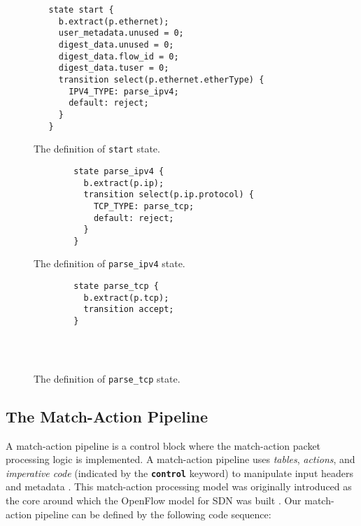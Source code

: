 \begin{figure}[!h]
	{\renewcommand{\baselinestretch}{0.8}\small
		\begin{verbatim}
   state start {
     b.extract(p.ethernet);
     user_metadata.unused = 0;
     digest_data.unused = 0;
     digest_data.flow_id = 0;
     digest_data.tuser = 0;
     transition select(p.ethernet.etherType) {
       IPV4_TYPE: parse_ipv4;
       default: reject;
     } 
   }
		\end{verbatim}
	}
\caption{The definition of \texttt{start} state.}
\label{fig:start}
\end{figure}

\begin{figure}[!h]
	\begin{minipage}{.48\textwidth}
		{\renewcommand{\baselinestretch}{0.8}\small
		\begin{verbatim}
		state parse_ipv4 {
		  b.extract(p.ip);
		  transition select(p.ip.protocol) {
		    TCP_TYPE: parse_tcp;
		    default: reject;
		  }
		}
		\end{verbatim}
		}
 		\caption{The definition of \texttt{parse\_ipv4} state.}
 		\label{fig:parseipv4}
	\end{minipage}
	\hfill
	\begin{minipage}{.48\textwidth}
		{\renewcommand{\baselinestretch}{0.8}\small
		\begin{verbatim}
		state parse_tcp {
		  b.extract(p.tcp);
		  transition accept;
		}
		    
		    
		    
		\end{verbatim}
		}	
		\caption{The definition of \texttt{parse\_tcp} state.}
		\label{fig:parsetcp}
	\end{minipage}
\end{figure}
		
	\subsection{The Match-Action Pipeline}
A match-action pipeline is a control block where the match-action packet processing logic is implemented. A match-action pipeline uses \textit{tables}, \textit{actions}, and \textit{imperative code} (indicated by the \textbf{\texttt{control}} keyword) to manipulate input headers and metadata \cite{fpga19}. This match-action processing model was originally introduced as the core around which the OpenFlow model for SDN was built \cite{mckeown}. Our match-action pipeline can be defined by the following code sequence:

